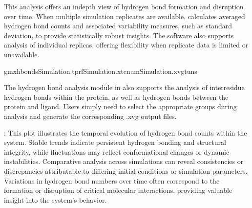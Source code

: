 \documentclass[a4paper,10pt,english]{sphinxmanual}
\begin{document}
\sphinxAtStartPar
This analysis offers an in\sphinxhyphen{}depth view of hydrogen bond formation and disruption over time. When multiple simulation replicates are available,  calculates averaged hydrogen bond counts and associated variability measures, such as standard deviation, to provide statistically robust insights. The software also supports analysis of individual replicas, offering flexibility when replicate data is limited or unavailable.

\sphinxAtStartPar
{}

\begin{sphinxVerbatim}[commandchars=\\\{\}]
gmxhbond\PYGZhy{}sSimulation.tpr\PYGZhy{}fSimulation.xtc\PYGZhy{}numSimulation.xvg\PYGZhy{}tuns
\end{sphinxVerbatim}

\sphinxAtStartPar
{} The hydrogen bond analysis module in  also supports the analysis of inter\sphinxhyphen{}residue hydrogen bonds within the protein, as well as hydrogen bonds between the protein and ligand. Users simply need to select the appropriate groups during analysis and generate the corresponding .xvg output files.

\begin{sphinxVerbatim}[commandchars=\\\{\}]
   
\end{sphinxVerbatim}

\noindent{}

\sphinxAtStartPar
{}: This plot illustrates the temporal evolution of hydrogen bond counts within the system. Stable trends indicate persistent hydrogen bonding and structural integrity, while fluctuations may reflect conformational changes or dynamic instabilities. Comparative analysis across simulations can reveal consistencies or discrepancies attributable to differing initial conditions or simulation parameters. Variations in hydrogen bond numbers over time often correspond to the formation or disruption of critical molecular interactions, providing valuable insight into the system’s behavior.
\end{document}
